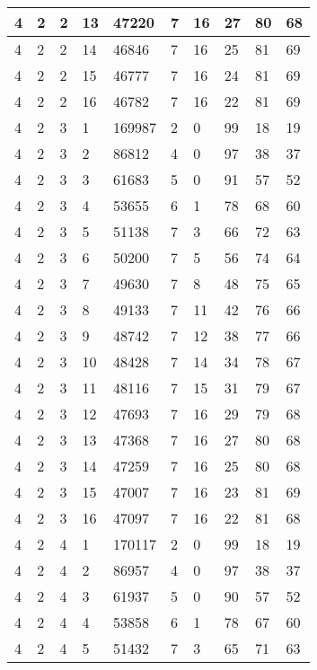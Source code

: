 \begin{table}[!ht]
\begin{tabular}{|l|l|l|l|l|l|l|l|l|l|}
        4 & 2 & 2 & 13 & 47220 & 7 & 16 & 27 & 80 & 68 \\ \hline
        4 & 2 & 2 & 14 & 46846 & 7 & 16 & 25 & 81 & 69 \\ \hline
        4 & 2 & 2 & 15 & 46777 & 7 & 16 & 24 & 81 & 69 \\ \hline
        4 & 2 & 2 & 16 & 46782 & 7 & 16 & 22 & 81 & 69 \\ \hline
        4 & 2 & 3 & 1 & 169987 & 2 & 0 & 99 & 18 & 19 \\ \hline
        4 & 2 & 3 & 2 & 86812 & 4 & 0 & 97 & 38 & 37 \\ \hline
        4 & 2 & 3 & 3 & 61683 & 5 & 0 & 91 & 57 & 52 \\ \hline
        4 & 2 & 3 & 4 & 53655 & 6 & 1 & 78 & 68 & 60 \\ \hline
        4 & 2 & 3 & 5 & 51138 & 7 & 3 & 66 & 72 & 63 \\ \hline
        4 & 2 & 3 & 6 & 50200 & 7 & 5 & 56 & 74 & 64 \\ \hline
        4 & 2 & 3 & 7 & 49630 & 7 & 8 & 48 & 75 & 65 \\ \hline
        4 & 2 & 3 & 8 & 49133 & 7 & 11 & 42 & 76 & 66 \\ \hline
        4 & 2 & 3 & 9 & 48742 & 7 & 12 & 38 & 77 & 66 \\ \hline
        4 & 2 & 3 & 10 & 48428 & 7 & 14 & 34 & 78 & 67 \\ \hline
        4 & 2 & 3 & 11 & 48116 & 7 & 15 & 31 & 79 & 67 \\ \hline
        4 & 2 & 3 & 12 & 47693 & 7 & 16 & 29 & 79 & 68 \\ \hline
        4 & 2 & 3 & 13 & 47368 & 7 & 16 & 27 & 80 & 68 \\ \hline
        4 & 2 & 3 & 14 & 47259 & 7 & 16 & 25 & 80 & 68 \\ \hline
        4 & 2 & 3 & 15 & 47007 & 7 & 16 & 23 & 81 & 69 \\ \hline
        4 & 2 & 3 & 16 & 47097 & 7 & 16 & 22 & 81 & 68 \\ \hline
        4 & 2 & 4 & 1 & 170117 & 2 & 0 & 99 & 18 & 19 \\ \hline
        4 & 2 & 4 & 2 & 86957 & 4 & 0 & 97 & 38 & 37 \\ \hline
        4 & 2 & 4 & 3 & 61937 & 5 & 0 & 90 & 57 & 52 \\ \hline
        4 & 2 & 4 & 4 & 53858 & 6 & 1 & 78 & 67 & 60 \\ \hline
        4 & 2 & 4 & 5 & 51432 & 7 & 3 & 65 & 71 & 63 \\ \hline

\end{tabular}
\end{table}
